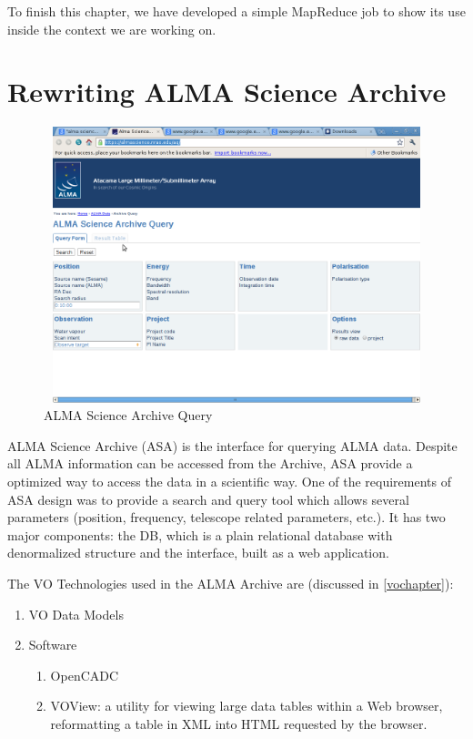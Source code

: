 To finish this chapter, we have developed a simple MapReduce job to show its use inside the context we are working on.




\section{Rewriting ALMA Science Archive}

\begin{figure}
\centering
\includegraphics[width=14cm,height=8cm]{images/aq.png}
\caption{ALMA Science Archive Query}
\end{figure}


ALMA Science Archive (ASA) is the interface for querying ALMA data. Despite all ALMA information can be accessed from the Archive, ASA provide a optimized way to access the data in a scientific way. One of the requirements of ASA design was to provide a search and query tool which allows several parameters (position, frequency, telescope related parameters, etc.). It has two major components: the DB, which is a plain relational database with denormalized structure and the interface, built as a web application.



The VO Technologies used in the ALMA Archive are (discussed in \ref{vochapter}):

\begin{enumerate}
\item VO Data Models
\item Software
  \begin{enumerate}
    \item OpenCADC
    \item VOView: a utility for viewing large data tables within a Web browser, reformatting a table in XML into HTML requested by the browser.
  \end{enumerate}
\end{enumerate}

